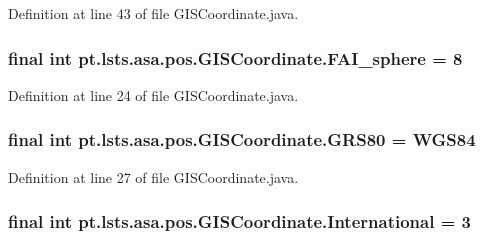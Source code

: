 Definition at line 43 of file G\+I\+S\+Coordinate.\+java.

\hypertarget{classpt_1_1lsts_1_1asa_1_1pos_1_1GISCoordinate_abfc0deced71decc2760cf956f6a9aafb}{}
\subsubsection[{F\+A\+I\+\_\+sphere}]{\setlength{\rightskip}{0pt plus 5cm}final int pt.\+lsts.\+asa.\+pos.\+G\+I\+S\+Coordinate.\+F\+A\+I\+\_\+sphere = 8\hspace{0.3cm}{\ttfamily [static]}}\label{classpt_1_1lsts_1_1asa_1_1pos_1_1GISCoordinate_abfc0deced71decc2760cf956f6a9aafb}


Definition at line 24 of file G\+I\+S\+Coordinate.\+java.

\hypertarget{classpt_1_1lsts_1_1asa_1_1pos_1_1GISCoordinate_abb8c183e4c3d7410cef70decc37f6f77}{}
\subsubsection[{G\+R\+S80}]{\setlength{\rightskip}{0pt plus 5cm}final int pt.\+lsts.\+asa.\+pos.\+G\+I\+S\+Coordinate.\+G\+R\+S80 = {\bf W\+G\+S84}\hspace{0.3cm}{\ttfamily [static]}}\label{classpt_1_1lsts_1_1asa_1_1pos_1_1GISCoordinate_abb8c183e4c3d7410cef70decc37f6f77}


Definition at line 27 of file G\+I\+S\+Coordinate.\+java.

\hypertarget{classpt_1_1lsts_1_1asa_1_1pos_1_1GISCoordinate_aa9a138dbdfc4e5213d000b910d78bebe}{}
\subsubsection[{International}]{\setlength{\rightskip}{0pt plus 5cm}final int pt.\+lsts.\+asa.\+pos.\+G\+I\+S\+Coordinate.\+International = 3\hspace{0.3cm}{\ttfamily [static]}}\label{classpt_1_1lsts_1_1asa_1_1pos_1_1GISCoordinate_aa9a138dbdfc4e5213d000b910d78bebe}


